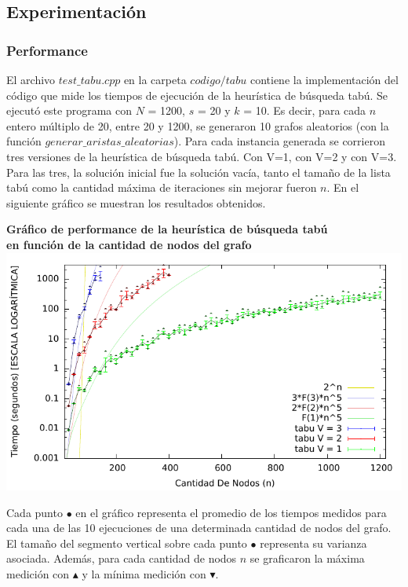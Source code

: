 \subsection{Experimentación}

\subsubsection{Performance}

\par{El archivo $test\_tabu.cpp$ en la carpeta $codigo/tabu$ contiene la
implementación del código que mide los tiempos de ejecución de la heurística
de búsqueda tabú. Se ejecutó este programa con $N$ = 1200, $s$ = 20 y $k$ = 10.
Es decir, para cada $n$ entero múltiplo de 20, entre 20 y 1200, se generaron
10 grafos aleatorios (con la función $generar\_aristas\_aleatorias$). Para cada
instancia generada se corrieron tres versiones de la heurística de búsqueda
tabú. Con V=1, con V=2 y con V=3. Para las tres, la solución inicial fue la
solución vacía, tanto el tamaño de la lista tabú como la cantidad máxima de
iteraciones sin mejorar fueron $n$.
En el siguiente gráfico se muestran los resultados obtenidos.}

\begin{center}
\textbf{Gráfico de performance de la heurística de búsqueda tabú\\ en
función de la cantidad de nodos del grafo}
\includegraphics[scale=1.3]{imgs/tabu_1200_20_10.pdf}
\end{center}

\par{Cada punto $\bullet$ en el gráfico representa el promedio de los tiempos
medidos para cada una de las 10 ejecuciones de una determinada cantidad de nodos
del grafo. El tamaño del segmento vertical sobre cada punto $\bullet$ representa
su varianza asociada. Además, para cada cantidad de nodos $n$ se graficaron la
máxima medición con $\blacktriangle$ y la mínima medición con
$\blacktriangledown$.}\\


